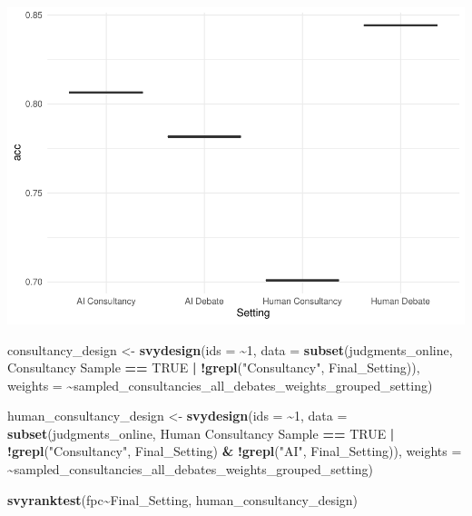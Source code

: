 \documentclass[
]{article}
\newenvironment{Shaded}{\begin{snugshade}}{\end{snugshade}}
\newcommand{\AttributeTok}[1]{\textcolor[rgb]{0.13,0.29,0.53}{#1}}
\newcommand{\ConstantTok}[1]{\textcolor[rgb]{0.56,0.35,0.01}{#1}}
\newcommand{\DecValTok}[1]{\textcolor[rgb]{0.00,0.00,0.81}{#1}}
\newcommand{\FunctionTok}[1]{\textcolor[rgb]{0.13,0.29,0.53}{\textbf{#1}}}
\newcommand{\NormalTok}[1]{#1}
\newcommand{\OtherTok}[1]{\textcolor[rgb]{0.56,0.35,0.01}{#1}}
\newcommand{\SpecialCharTok}[1]{\textcolor[rgb]{0.81,0.36,0.00}{\textbf{#1}}}
\newcommand{\StringTok}[1]{\textcolor[rgb]{0.31,0.60,0.02}{#1}}
\begin{document}
\includegraphics{debate-2309_files/figure-latex/final probability correct-2.pdf}

\begin{Shaded}
\begin{Highlighting}[]
\NormalTok{consultancy\_design }\OtherTok{\textless{}{-}} \FunctionTok{svydesign}\NormalTok{(}\AttributeTok{ids =} \SpecialCharTok{\textasciitilde{}}\DecValTok{1}\NormalTok{, }\AttributeTok{data =} \FunctionTok{subset}\NormalTok{(judgments\_online, }\StringTok{\textasciigrave{}}\AttributeTok{Consultancy Sample}\StringTok{\textasciigrave{}} \SpecialCharTok{==} \ConstantTok{TRUE} \SpecialCharTok{|} \SpecialCharTok{!}\FunctionTok{grepl}\NormalTok{(}\StringTok{"Consultancy"}\NormalTok{, Final\_Setting)), }\AttributeTok{weights =} \SpecialCharTok{\textasciitilde{}}\NormalTok{sampled\_consultancies\_all\_debates\_weights\_grouped\_setting)}



\NormalTok{human\_consultancy\_design }\OtherTok{\textless{}{-}} \FunctionTok{svydesign}\NormalTok{(}\AttributeTok{ids =} \SpecialCharTok{\textasciitilde{}}\DecValTok{1}\NormalTok{, }\AttributeTok{data =} \FunctionTok{subset}\NormalTok{(judgments\_online, }\StringTok{\textasciigrave{}}\AttributeTok{Human Consultancy Sample}\StringTok{\textasciigrave{}} \SpecialCharTok{==} \ConstantTok{TRUE} \SpecialCharTok{|} \SpecialCharTok{!}\FunctionTok{grepl}\NormalTok{(}\StringTok{"Consultancy"}\NormalTok{, Final\_Setting) }\SpecialCharTok{\&} \SpecialCharTok{!}\FunctionTok{grepl}\NormalTok{(}\StringTok{"AI"}\NormalTok{, Final\_Setting)), }\AttributeTok{weights =} \SpecialCharTok{\textasciitilde{}}\NormalTok{sampled\_consultancies\_all\_debates\_weights\_grouped\_setting)}


\FunctionTok{svyranktest}\NormalTok{(fpc}\SpecialCharTok{\textasciitilde{}}\NormalTok{Final\_Setting, human\_consultancy\_design)}
\end{Highlighting}
\end{Shaded}
\end{document}
